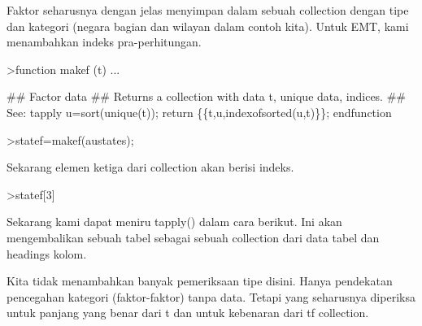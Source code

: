 \documentclass[a4paper,10pt]{article}
\begin{document}
\begin{eulernotebook}
\begin{eulercomment}
\begin{eulercomment}
\begin{eulercomment}
\begin{eulercomment}
\begin{eulercomment}
Faktor seharusnya dengan jelas menyimpan dalam sebuah collection
dengan tipe dan kategori (negara bagian dan wilayan dalam contoh
kita). Untuk EMT, kami menambahkan indeks pra-perhitungan.
\end{eulercomment}
\begin{eulerprompt}
>function makef (t) ...
\end{eulerprompt}
\begin{eulerudf}
  ## Factor data
  ## Returns a collection with data t, unique data, indices.
  ## See: tapply
  u=sort(unique(t));
  return \{\{t,u,indexofsorted(u,t)\}\};
  endfunction
\end{eulerudf}
\begin{eulerprompt}
>statef=makef(austates);
\end{eulerprompt}
\begin{eulercomment}
Sekarang elemen ketiga dari collection akan berisi indeks.
\end{eulercomment}
\begin{eulerprompt}
>statef[3]
\end{eulerprompt}
\begin{euleroutput}
  [6,  5,  4,  2,  2,  3,  8,  8,  4,  7,  2,  7,  4,  4,  5,  6,  5,  3,
  8,  7,  4,  2,  2,  8,  5,  1,  2,  7,  7,  1]
\end{euleroutput}
\begin{eulercomment}
Sekarang kami dapat meniru tapply() dalam cara berikut. Ini akan
mengembalikan sebuah tabel sebagai sebuah collection dari data tabel
dan headings kolom.
\end{eulercomment}
\begin{eulercomment}
Kita tidak menambahkan banyak pemeriksaan tipe disini. Hanya
pendekatan pencegahan kategori (faktor-faktor) tanpa data. Tetapi yang
seharusnya diperiksa untuk panjang yang benar dari t dan untuk
kebenaran dari tf collection.


\end{eulercomment}
\end{eulercomment}
\end{eulercomment}
\end{eulercomment}
\end{eulercomment}
\end{eulernotebook}
\end{document}
